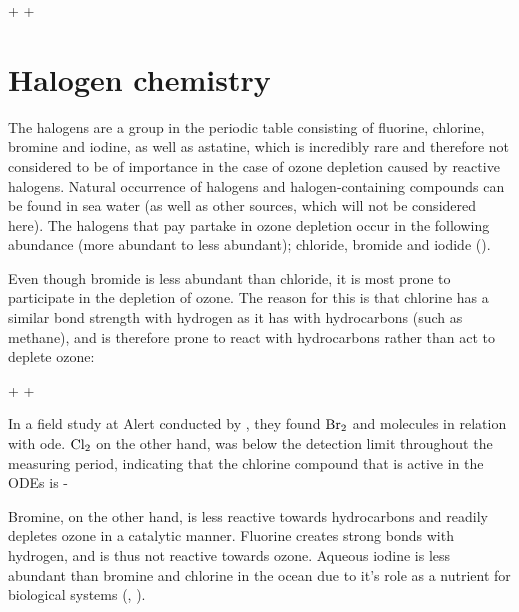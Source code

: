 \begin{reaction}
     +  \rightarrow {} + 
    \label{rqn:o3no}
\end{reaction}




\section{Halogen chemistry}\label{sec:halogen_chemistry}


The halogens are a group in the periodic table consisting of fluorine, chlorine, bromine and iodine, as well as astatine, which is incredibly rare and therefore not considered to be of importance in the case of ozone depletion caused by reactive halogens. Natural occurrence of halogens and halogen-containing compounds can be found in sea water (as well as other sources, which will not be considered here). The halogens that pay partake in ozone depletion occur in the following abundance (more abundant to less abundant); chloride, bromide and iodide (\cite{Simpson2015}). 

\medskip

Even though bromide is less abundant than chloride, it is most prone to participate in the depletion of ozone. The reason for this is that chlorine has a similar bond strength with hydrogen as it has with hydrocarbons (such as methane), and is therefore prone to react with hydrocarbons rather than act to deplete ozone: 

\begin{reaction}
     +  \rightarrow {} + 
    \label{R:cl_ch4}
\end{reaction}

In a field study at Alert conducted by \cite{Foster2001}, they found $\mathrm{Br_2}$ and  molecules in relation with \acrshort{ode}. $\mathrm{Cl_2}$ on the other hand, was below the detection limit throughout the measuring period, indicating that the chlorine compound that is active in the ODEs is - 

\medskip

Bromine, on the other hand, is less reactive towards hydrocarbons and readily depletes ozone in a catalytic manner.  Fluorine creates strong bonds with hydrogen, and is thus not reactive towards ozone. Aqueous iodine is less abundant than bromine and chlorine in the ocean due to it's role as a nutrient for biological systems (\cite{FinlaysonPitts2010}, \cite{Simpson2015}). 

